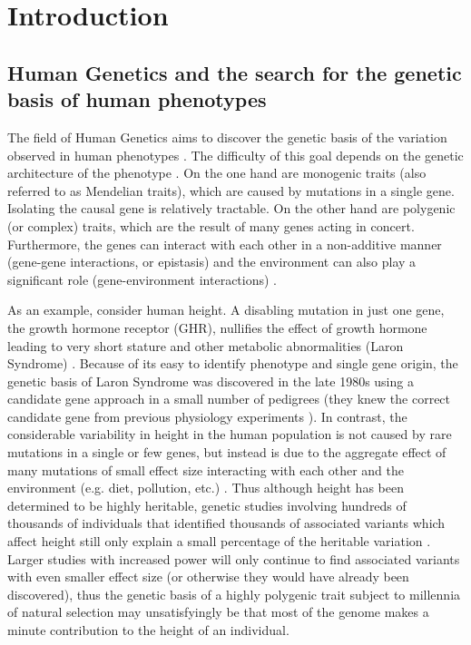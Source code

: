 \chapter{Introduction}

\section{Human Genetics and the search for the genetic basis of human phenotypes}

The field of Human Genetics aims to discover the genetic basis of the
variation observed in human phenotypes \citep{Strachan2011}. The difficulty of this goal
depends on the genetic architecture of the phenotype \citep{DiRienzo2006, Bodmer2008, Schork2009}. On the one hand
are monogenic traits (also referred to as Mendelian traits), which are
caused by mutations in a single gene. Isolating the causal gene is
relatively tractable. On the other hand are polygenic (or complex)
traits, which are the result of many genes acting in
concert. Furthermore, the genes can interact with each other in a
non-additive manner (gene-gene interactions, or epistasis) \citep{Cordell2009, Mechanic2012} and the
environment can also play a significant role (gene-environment
interactions) \citep{Thomas2010, Ober2011}.

As an example, consider human height. A disabling mutation in just one
gene, the growth hormone receptor (GHR), nullifies the effect of
growth hormone leading to very short stature and other metabolic
abnormalities (Laron Syndrome) \citep{Laron2011}. Because of its easy to identify
phenotype and single gene origin, the genetic basis of Laron Syndrome
was discovered in the late 1980s using a candidate gene approach
in a small number of pedigrees \citep{Amselem1989, Godowski1989, Shevah2011}
(they knew the correct candidate gene from previous physiology experiments \citep{Eshet1984}). In
contrast, the considerable variability in height in the human
population is not caused by rare mutations in a single or few genes,
but instead is due to the aggregate effect of many mutations of small
effect size interacting with each other and the environment
(e.g. diet, pollution, etc.) \citep{Lettre2011, Turchin2012}. Thus although height has been determined
to be highly heritable, genetic studies involving hundreds of
thousands of individuals that identified thousands of associated
variants which affect height still only explain a small percentage of
the heritable variation \citep{LangoAllen2010, Wood2014}. Larger studies with increased power will only
continue to find associated variants with even smaller effect size (or
otherwise they would have already been discovered), thus the genetic
basis of a highly polygenic trait subject to millennia of natural
selection may unsatisfyingly be that most of the genome makes a minute
contribution to the height of an individual.

